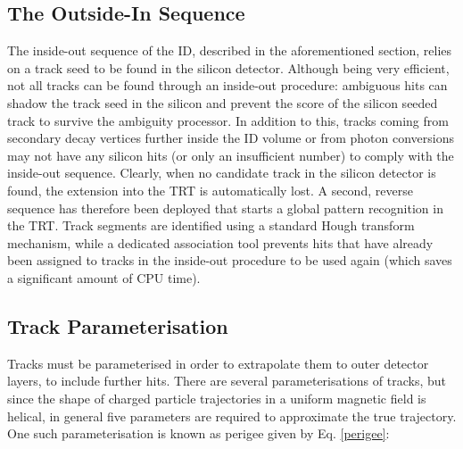 




\subsection{The Outside-In Sequence}
The inside-out sequence of the ID, described in the aforementioned section, relies on a track seed to be found in the silicon detector. Although being very efficient, not all tracks can be found through an inside-out procedure: ambiguous hits can shadow the track seed in the silicon and prevent the score of the silicon seeded track to survive the ambiguity processor. In addition to this, tracks coming from secondary decay vertices further inside the ID volume or from photon conversions may not have any silicon hits (or only an insufficient number) to comply with the inside-out sequence. Clearly, when no candidate track in the silicon detector is found, the extension into the TRT is automatically lost. A second, reverse sequence has therefore been deployed that starts a global pattern recognition in the TRT. Track segments are identified using a standard Hough transform mechanism, while a dedicated association tool prevents hits that have already been assigned to tracks in the inside-out procedure to be used again (which saves a significant amount of CPU time).



\subsection{Track Parameterisation}
\label{track-parameterisation}

Tracks must be parameterised in order to extrapolate them to outer detector layers, to include further hits. There are several parameterisations of tracks, but since the shape of charged particle trajectories in a uniform magnetic field is helical, in general five parameters are required to approximate the true trajectory. One such parameterisation is known as perigee given by Eq. \ref{perigee}:

